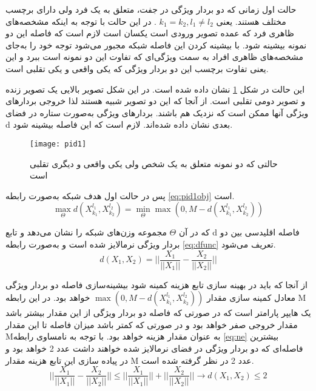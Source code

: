   حالت اول زمانی که دو بردار ویژگی در جفت، متعلق به یک فرد ولی دارای برچسب مختلف هستند. یعنی 
  $k_1=k_2 , l_1 \ne l_2 $
  . در این حالت با توجه به اینکه مشخصه‌های ظاهری فرد که عمده تصویر ورودی است یکسان است لازم است که فاصله این دو نمونه بیشینه شود. با بیشینه کردن این فاصله شبکه مجبور می‌شود توجه خود را به‌جای مشخصه‌های ظاهری افراد به سمت ویژگی‌ای که تفاوت این دو نمونه است ببرد و این یعنی تفاوت برچسب این دو بردار ویژگی که یکی واقعی و یکی تقلبی است. 
  
  این حالت در شکل
\ref{fig:pid1}
  نشان داده شده است. در این شکل تصویر بالایی یک تصویر زنده و تصویر دومی تقلبی است. از آنجا که این دو تصویر شبیه هستند لذا خروجی بردارهای ویژگی آنها ممکن است که نزدیک هم باشند. بردارهای ویژگی به‌صورت ستاره در فضای d بعدی نشان داده شده‌اند. لازم است که این فاصله بیشینه شود.
  
 \begin{figure}[ht]
 	\centerline{\texttt{[image: pid1]}}
 	\caption{حالتی که دو نمونه متعلق به یک شخص ولی یکی واقعی و دیگری تقلبی است}
 	\label{fig:pid1}
 \end{figure}

پس در حالت اول هدف شبکه به‌صورت رابطه
\ref{eq:pid1obj}
است.
\begin{equation}\label{eq:pid1obj}
	\max_{\Theta} {d( X_{k_1}^{l_1},X_{k_2}^{l_2} )} = \min_{\Theta}{\max(0,M-d( X_{k_1}^{l_1},X_{k_2}^{l_2} ))}
\end{equation}

که در آن 
$\Theta$
 مجموعه وزن‌های شبکه را نشان می‌دهد و تابع d فاصله اقلیدسی بین دو بردار ویژگی نرمالایز شده است و به‌صورت رابطه 
\ref{eq:dfunc}
  تعریف می‌شود.
  \begin{equation}\label{eq:dfunc}
  	d(X_1,X_2) = ||\frac{X_1}{||X_1||}-\frac{X_2}{||X_2||}||
  \end{equation}

از آنجا که باید در بهینه سازی تابع هزینه کمینه شود بیشینه‌سازی فاصله دو بردار ویژگی معادل کمینه سازی مقدار 
$\max(0,M-d( X_{k_1}^{l_1},X_{k_2}^{l_2} ))$
 خواهد بود. در این رابطه M یک هایپر پارامتر است که در صورتی که فاصله دو بردار ویژگی از این مقدار بیشتر باشد مقدار خروجی صفر خواهد بود و در صورتی که کمتر باشد میزان فاصله تا این مقدار Mبه عنوان مقدار هزینه خواهد بود.
با توجه به نامساوی رابطه
\ref{eq:ne}
بیشترین فاصله‌ای که دو بردار ویژگی در فضای نرمالایز شده خواهند داشت عدد 2 خواهد بود و در پیاده سازی این تابع هزینه مقدار M عدد 2 در نظر گرفته شده است.
  \begin{equation}\label{eq:ne}
	||\frac{X_1}{||X_1||}-\frac{X_2}{||X_2||}|| \le ||\frac{X_1}{||X_1||}||+||\frac{X_2}{||X_2||}||   \to d(X_1,X_2) \le 2
\end{equation}

